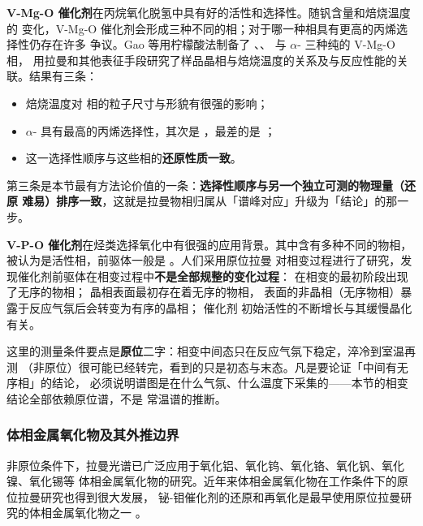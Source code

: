 \textbf{V-Mg-O 催化剂}在丙烷氧化脱氢中具有好的活性和选择性。随钒含量和焙烧温度的
变化，V-Mg-O 催化剂会形成三种不同的相；对于哪一种相具有更高的丙烯选择性仍存在许多
争议。Gao 等用柠檬酸法制备了
、、 与 $\alpha$- 三种纯的 V-Mg-O 相，
用拉曼和其他表征手段研究了样品晶相与焙烧温度的关系及与反应性能的关联。结果有三条：

\begin{itemize}
\item 焙烧温度对  相的粒子尺寸与形貌有很强的影响；
\item $\alpha$- 具有最高的丙烯选择性，其次是 ，最差的是
  ；
\item 这一选择性顺序与这些相的\textbf{还原性质一致}。
\end{itemize}

第三条是本节最有方法论价值的一条：\textbf{选择性顺序与另一个独立可测的物理量（还原
难易）排序一致}，这就是拉曼物相归属从「谱峰对应」升级为「结论」的那一步。

\textbf{V-P-O 催化剂}在烃类选择氧化中有很强的应用背景。其中含有多种不同的物相，
 被认为是活性相，前驱体一般是 。人们采用原位拉曼
对相变过程进行了研究，发现催化剂前驱体在相变过程中\textbf{不是全部规整的变化过程}：
在相变的最初阶段出现了无序的物相； 晶相表面最初存在着无序的物相，
表面的非晶相（无序物相）暴露于反应气氛后会转变为有序的晶相； 催化剂
初始活性的不断增长与其缓慢晶化有关。

\begin{measure}
这里的测量条件要点是\textbf{原位}二字：相变中间态只在反应气氛下稳定，淬冷到室温再测
（非原位）很可能已经转完，看到的只是初态与末态。凡是要论证「中间有无序相」的结论，
必须说明谱图是在什么气氛、什么温度下采集的——本节的相变结论全部依赖原位谱，不是
常温谱的推断。
\end{measure}

\subsubsection{体相金属氧化物及其外推边界}

非原位条件下，拉曼光谱已广泛应用于氧化铝、氧化钨、氧化铬、氧化钒、氧化镍、氧化锡等
体相金属氧化物的研究。近年来体相金属氧化物在工作条件下的原位拉曼研究也得到很大发展，
铋-钼催化剂的还原和再氧化是最早使用原位拉曼研究的体相金属氧化物之一
。

